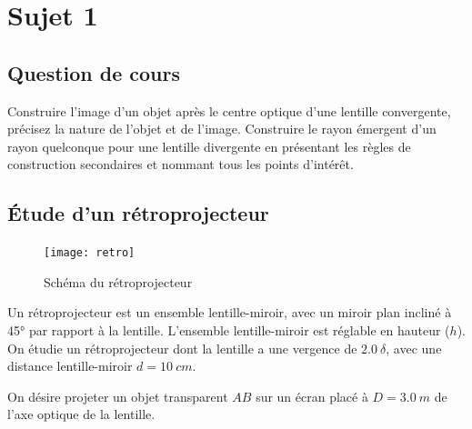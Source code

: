 \documentclass[a4paper, 11pt, oneside]{book}
\begin{document}
\resetQ
\newpage

\chapter{Sujet 1}
\section{Question de cours}

Construire l'image d'un objet après le centre optique d'une lentille
convergente, précisez la nature de l'objet et de l'image. Construire le rayon
émergent d'un rayon quelconque pour une lentille divergente en présentant les
règles de construction secondaires et nommant tous les points d’intérêt.

\section{Étude d'un rétroprojecteur}
\begin{figure}
    \vspace*{-18pt}
    \centering
    \texttt{[image: retro]}
    \caption{Schéma du rétroprojecteur}
    \label{fig:retro}
\end{figure}

Un rétroprojecteur est un ensemble lentille-miroir, avec un miroir plan incliné
à \ang{45;;} par rapport à la lentille. L'ensemble lentille-miroir est réglable
en hauteur ($h$). On étudie un rétroprojecteur dont la lentille a une vergence
de $\SI{2.0}{\delta}$, avec une distance lentille-miroir $d = \SI{10}{cm}$. 

On désire projeter un objet transparent $AB$ sur un écran placé à $D =
\SI{3.0}{m}$ de l'axe optique de la lentille.
\end{document}
